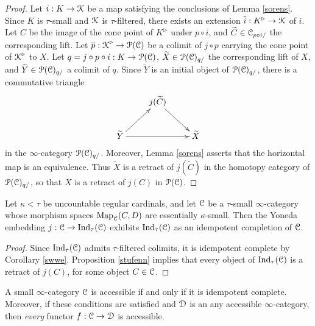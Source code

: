 \begin{proof}
Let $i: K \rightarrow \operatorname{\mathcal{K}}$ be a map satisfying the conclusions of Lemma \ref{sorens}. Since
$K$ is $\tau$-small and $\operatorname{\mathcal{K}}$ is $\tau$-filtered, there exists an extension
$\overline{i}: K^{\triangleright} \rightarrow \operatorname{\mathcal{K}}$ of $i$. Let $C$ be the image of the cone point
of $K^{\triangleright}$ under $p \circ \overline{i}$, and $\widetilde{C} \in \operatorname{\mathcal{C}}_{p \circ i/}$ the
corresponding lift. Let $\overline{p}: \operatorname{\mathcal{K}}^{\triangleright} \rightarrow \operatorname{\mathcal{P}}(\operatorname{\mathcal{C}})$
be a colimit of $j \circ p$ carrying the cone point of $\operatorname{\mathcal{K}}^{\triangleright}$ to
$X$. Let $q = j \circ p \circ i: K \rightarrow \operatorname{\mathcal{P}}(\operatorname{\mathcal{C}})$, $\widetilde{X} \in \operatorname{\mathcal{P}}(\operatorname{\mathcal{C}})_{q/}$ the corresponding lift of $X$, and $\widetilde{Y} \in \operatorname{\mathcal{P}}(\operatorname{\mathcal{C}})_{q/}$ a colimit of $q$. 
Since $\widetilde{Y}$ is an initial object of $\operatorname{\mathcal{P}}(\operatorname{\mathcal{C}})_{q/}$, there is a commutative triangle
$$ \xymatrix{ & j( \widetilde{C}) \ar[dr] & \\
\widetilde{Y} \ar[rr] \ar[ur] & & \widetilde{X} }$$
in the $\infty$-category $\operatorname{\mathcal{P}}(\operatorname{\mathcal{C}})_{q/}$. Moreover, Lemma \ref{sorens} asserts that
the horizontal map is an equivalence. Thus $\widetilde{X}$ is a retract of
$j(\widetilde{C})$ in the homotopy category of $\operatorname{\mathcal{P}}(\operatorname{\mathcal{C}})_{q/}$, so that
$X$ is a retract of $j(C)$ in $\operatorname{\mathcal{P}}(\operatorname{\mathcal{C}})$.
\end{proof}

\begin{corollary}\label{tyrrus}
Let $\kappa < \tau$ be uncountable regular cardinals, and let $\operatorname{\mathcal{C}}$ be a $\tau$-small $\infty$-category whose morphism spaces $\operatorname{{Map}}_{\operatorname{\mathcal{C}}}(C,D)$ are essentially $\kappa$-small. 
Then the Yoneda embedding $j: \operatorname{\mathcal{C}} \rightarrow \operatorname{Ind}_{\tau}(\operatorname{\mathcal{C}})$ exhibits
$\operatorname{Ind}_{\tau}(\operatorname{\mathcal{C}})$ as an idempotent completion of $\operatorname{\mathcal{C}}$.
\end{corollary}

\begin{proof}
Since $\operatorname{Ind}_{\tau}(\operatorname{\mathcal{C}})$ admits $\tau$-filtered colimits, it is idempotent complete by Corollary \ref{swwe}. Proposition \ref{stufenn} implies that every object of $\operatorname{Ind}_{\tau}(\operatorname{\mathcal{C}})$ is a retract of $j(C)$, for some object $C \in \operatorname{\mathcal{C}}$.
\end{proof}

\begin{corollary}\label{sloam}
A small $\infty$-category $\operatorname{\mathcal{C}}$ is accessible if and only if it is idempotent complete. Moreover, if these conditions are satisfied and $\operatorname{\mathcal{D}}$ is an any accessible $\infty$-category, then
{\em every} functor $f: \operatorname{\mathcal{C}} \rightarrow \operatorname{\mathcal{D}}$ is accessible.
\end{corollary}

